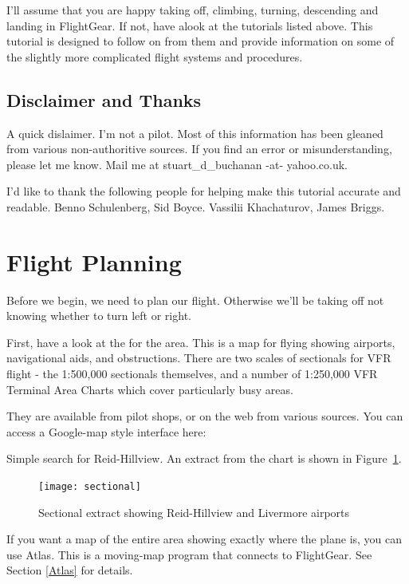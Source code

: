 I'll assume that you are happy taking off, climbing, turning, descending 
and landing in FlightGear. If not, have alook at the tutorials listed above. 
This tutorial is designed to follow on from them and provide information on 
some of the slightly more complicated flight systems and procedures.

\subsection{Disclaimer and Thanks}

A quick dislaimer. I'm not a pilot. Most of this information has been gleaned 
from various non-authoritive sources. If you find an error or misunderstanding, 
please let me know. Mail me at stuart\_d\_buchanan -at- yahoo.co.uk.

I'd like to thank the following people for helping make this tutorial accurate 
and readable. Benno Schulenberg, Sid Boyce. Vassilii Khachaturov, James Briggs.

\section{Flight Planning}

Before we begin, we need to plan our flight. 
Otherwise we'll be taking off not knowing whether to turn left or right.

First, have a look at the  for the area. This is a map for 
flying showing airports, navigational aids, and obstructions. 
There are two scales of sectionals for VFR flight - 
the 1:500,000 sectionals themselves, and a number of 
1:250,000 VFR Terminal Area Charts which cover particularly busy areas.

They are available from pilot shops, or on the web from various sources. 
You can access a Google-map style interface here:

\medskip
{}
\medskip

Simple search for Reid-Hillview. An extract from the chart is shown in Figure~\ref{sectional}.

\begin{figure}[!htp]
\centering
\texttt{[image: sectional]}
\caption{Sectional extract showing Reid-Hillview and Livermore airports\label{sectional}}
\end{figure}

If you want a map of the entire area showing exactly where the plane is, 
you can use Atlas. 
This is a moving-map program that connects to FlightGear. See Section \ref{Atlas} for details.

